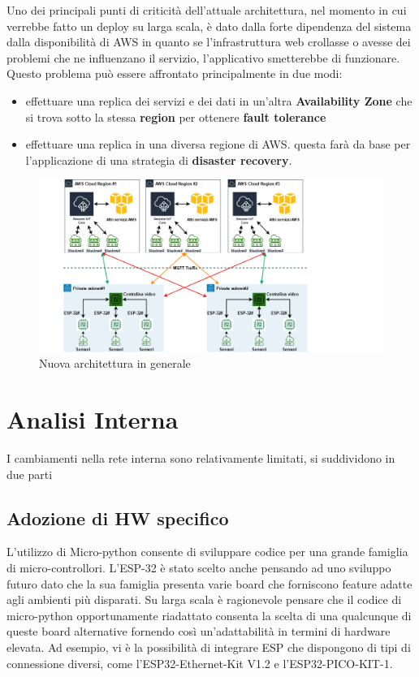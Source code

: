 Uno dei principali punti di criticità dell'attuale architettura, nel momento in cui verrebbe fatto un deploy su larga scala, è dato dalla forte dipendenza del sistema dalla disponibilità di AWS in quanto se l'infrastruttura web crollasse o avesse dei problemi che ne influenzano il servizio, l'applicativo smetterebbe di funzionare. 
 Questo problema può essere affrontato principalmente in due modi:
\begin{itemize}
    \item  effettuare una replica dei servizi e dei dati in un'altra\textbf{ Availability Zone} che si trova sotto la stessa \textbf{region} per ottenere \textbf{fault tolerance}
    \item  effettuare una replica in una diversa regione di AWS. questa farà da base per l'applicazione di una strategia di \textbf{disaster recovery}. 
\end{itemize}

    \begin{figure}[H]
        \caption{Nuova architettura in generale}
        \label{fig:NewArch}
        \centering
        \includegraphics[width=1\textwidth]{DrawIo/ScaledArchitecture.png}
    \end{figure}
 

\section{Analisi Interna}
    I cambiamenti nella rete interna sono relativamente limitati, si suddividono in due parti
    \subsection{Adozione di HW specifico}
    L'utilizzo di Micro-python consente di sviluppare codice per una grande famiglia di micro-controllori. L'ESP-32 è stato scelto anche pensando ad uno sviluppo futuro dato che la sua famiglia presenta varie board che forniscono feature adatte agli ambienti più disparati. Su larga scala è ragionevole pensare che il codice di micro-python opportunamente riadattato consenta la scelta di una qualcunque di queste board alternative fornendo così un'adattabilità in termini di hardware elevata. Ad esempio, vi è la possibilità di integrare ESP che dispongono di tipi di connessione diversi, come l'ESP32-Ethernet-Kit V1.2 e l'ESP32-PICO-KIT-1.
    
